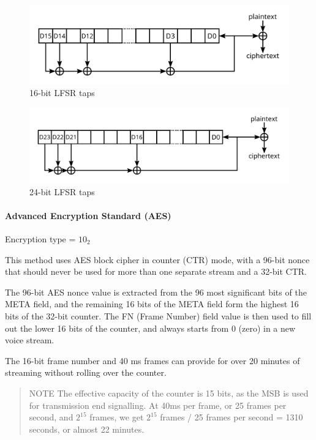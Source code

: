 \documentclass[a4paper,11pt]{book}
\begin{document}
\begin{figure}[H]
	\centering
	\includegraphics{img/LFSR_16}
	\caption{16-bit LFSR taps}
	\label{fig:lfsr16}
\end{figure}

\begin{figure}[H]
	\centering
	\includegraphics{img/LFSR_24}
	\caption{24-bit LFSR taps}
	\label{fig:lfsr24}
\end{figure}

\paragraph{Advanced Encryption Standard (AES)}

Encryption type = $10_2$

This method uses AES block cipher in counter (CTR) mode, with a 96-bit nonce that should never be used for more than one separate stream and a 32-bit CTR.

The 96-bit AES nonce value is extracted from the 96 most significant bits of the META field, and the remaining 16 bits of the META field form the highest 16 bits of the 32-bit counter. The FN (Frame Number) field value is then used to fill out the lower 16 bits of the counter, and always starts from 0 (zero) in a new voice stream.

The 16-bit frame number and 40 ms frames can provide for over 20 minutes of streaming without rolling over the counter.

\begin{quote}
	NOTE The effective capacity of the counter is 15 bits, as the MSB is used for transmission end signalling. At 40ms per frame, or 25 frames per second, and $2^{15}$ frames, we get $2^{15}$ frames / 25 frames per second = 1310 seconds, or almost 22 minutes.
\end{quote}
\end{document}
